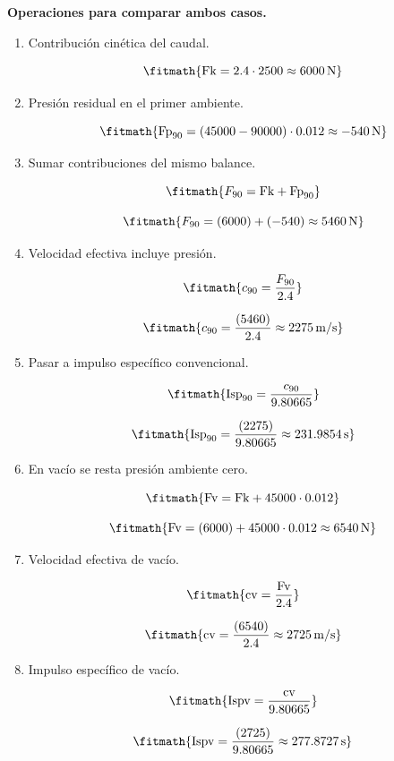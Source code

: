 \textbf{Operaciones para comparar ambos casos.}
\begin{enumerate}

\item Contribución cinética del caudal.

\[\fitmath{\mathrm{Fk}=2.4\cdot 2500\approx 6000\,\mathrm{N}}\]

\item Presión residual en el primer ambiente.

\[\fitmath{\mathrm{Fp}_{90}=\left(45000-90000\right)\cdot 0.012\approx -540\,\mathrm{N}}\]

\item Sumar contribuciones del mismo balance.

\[\fitmath{F_{90}=\mathrm{Fk}+\mathrm{Fp}_{90}}\]

\[\fitmath{F_{90}=(6000)+(-540)\approx 5460\,\mathrm{N}}\]

\item Velocidad efectiva incluye presión.

\[\fitmath{c_{90}=\frac{F_{90}}{2.4}}\]

\[\fitmath{c_{90}=\frac{(5460)}{2.4}\approx 2275\,\mathrm{m/s}}\]

\item Pasar a impulso específico convencional.

\[\fitmath{\mathrm{Isp}_{90}=\frac{c_{90}}{9.80665}}\]

\[\fitmath{\mathrm{Isp}_{90}=\frac{(2275)}{9.80665}\approx 231.9854\,\mathrm{s}}\]

\item En vacío se resta presión ambiente cero.

\[\fitmath{\mathrm{Fv}=\mathrm{Fk}+45000\cdot 0.012}\]

\[\fitmath{\mathrm{Fv}=(6000)+45000\cdot 0.012\approx 6540\,\mathrm{N}}\]

\item Velocidad efectiva de vacío.

\[\fitmath{\mathrm{cv}=\frac{\mathrm{Fv}}{2.4}}\]

\[\fitmath{\mathrm{cv}=\frac{(6540)}{2.4}\approx 2725\,\mathrm{m/s}}\]

\item Impulso específico de vacío.

\[\fitmath{\mathrm{Ispv}=\frac{\mathrm{cv}}{9.80665}}\]

\[\fitmath{\mathrm{Ispv}=\frac{(2725)}{9.80665}\approx 277.8727\,\mathrm{s}}\]

\end{enumerate}

